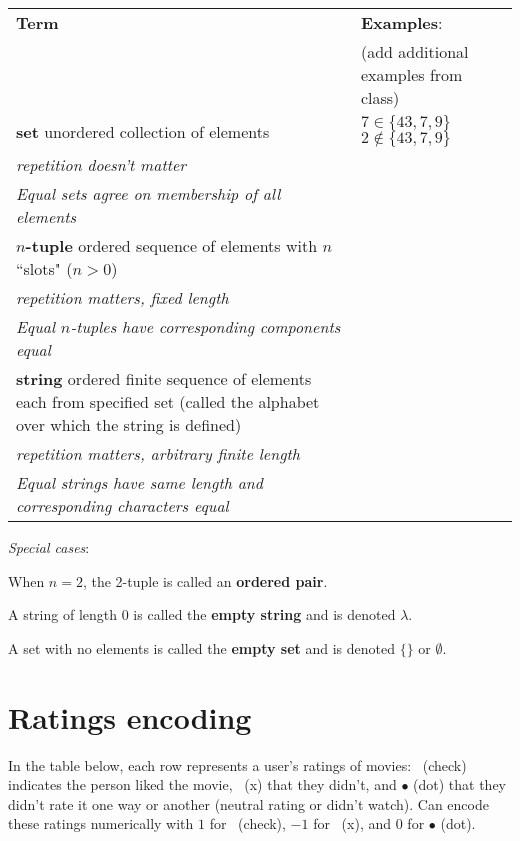 \documentclass[12pt, oneside]{article}
\newcommand{\cmark}{\ding{51}}
\newcommand{\xmark}{\ding{55}}
\begin{document}
\begin{center}
    \begin{tabular}{p{4.6in}p{2.6in}}
    {\bf  Term} & {\bf Examples}:\\
    &  (add additional examples from class)\\
    \hline 
    {\bf set} \newline
    unordered collection of elements & $7 \in \{43, 7, 9 \}$ \qquad $2 \notin \{43, 7, 9 \}$ \\
    {\it repetition doesn't matter} & \\
    {\it Equal sets agree on membership of all elements}& \\
    \hline
    {\bf $n$-tuple} \newline
    ordered sequence of elements with $n$ ``slots" ($n >0$) & \\
    {\it repetition matters, fixed length} &\\
    {\it Equal $n$-tuples have corresponding components equal}& \\
    \hline
    {\bf string} \newline
    ordered finite sequence of elements each from specified
    set (called the alphabet over which the string is defined)& \\
    {\it repetition matters, arbitrary finite length} &\\
    {\it Equal strings have same length and corresponding characters equal}
    \end{tabular}
\end{center}

{\it Special cases}: 

When $n=2$, the 2-tuple is called an {\bf ordered pair}.

A string of length $0$ is called the {\bf empty string} and is denoted $\lambda$.

A set with no elements is called the {\bf empty set} and is denoted $\{\}$ or $\emptyset$. \vfill
\section*{Ratings encoding}


In the table  below,  each row represents a user's ratings of movies: 
\cmark~(check) indicates the person liked the movie, \xmark~(x)
that they didn't, and $\bullet$ (dot) that they didn't rate it one way or 
another (neutral rating or didn't watch). Can encode
these ratings numerically with $1$ for \cmark~(check), $-1$ for \xmark~(x), 
and $0$ for $\bullet$ (dot).
\end{document}
